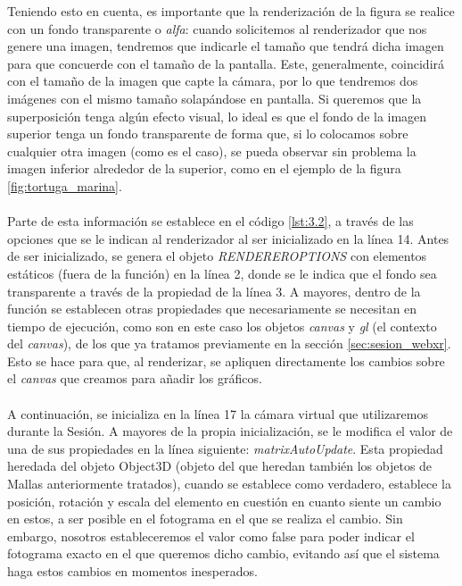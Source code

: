 \documentclass{subfiles}
\begin{document}
        Teniendo esto en cuenta, es importante que la renderización de la figura se realice con un fondo transparente o \textit{alfa}: cuando solicitemos al renderizador que nos genere una imagen, tendremos que indicarle el tamaño que tendrá dicha imagen para que concuerde con el tamaño de la pantalla. Este, generalmente, coincidirá con el tamaño de la imagen que capte la cámara, por lo que tendremos dos imágenes con el mismo tamaño solapándose en pantalla. Si queremos que la superposición tenga algún efecto visual, lo ideal es que el fondo de la imagen superior tenga un fondo transparente de forma que, si lo colocamos sobre cualquier otra imagen (como es el caso), se pueda observar sin problema la imagen inferior alrededor de la superior, como en el ejemplo de la figura \ref{fig:tortuga_marina}.
        
        \paragraph{}
        Parte de esta información se establece en el código \ref{lst:3.2}, a través de las opciones que se le indican al renderizador al ser inicializado en la línea 14. Antes de ser inicializado, se genera el objeto \textit{RENDEREROPTIONS} con elementos estáticos (fuera de la función) en la línea 2, donde se le indica que el fondo sea transparente a través de la propiedad de la línea 3. A mayores, dentro de la función se establecen otras propiedades que necesariamente se necesitan en tiempo de ejecución, como son en este caso los objetos \textit{canvas} y \textit{gl} (el contexto del \textit{canvas}), de los que ya tratamos previamente en la sección \ref{sec:sesion_webxr}. Esto se hace para que, al renderizar, se apliquen directamente los cambios sobre el \textit{canvas} que creamos para añadir los gráficos.

        \paragraph{}
        A continuación, se inicializa en la línea 17 la cámara virtual que utilizaremos durante la Sesión. A mayores de la propia inicialización, se le modifica el valor de una de sus propiedades en la línea siguiente: \textit{matrixAutoUpdate}. Esta propiedad heredada del objeto Object3D (objeto del que heredan también los objetos de Mallas anteriormente tratados), cuando se establece como verdadero, establece la posición, rotación y escala del elemento en cuestión en cuanto siente un cambio en estos, a ser posible en el fotograma en el que se realiza el cambio. Sin embargo, nosotros estableceremos el valor como false para poder indicar el fotograma exacto en el que queremos dicho cambio, evitando así que el sistema haga estos cambios en momentos inesperados.
        
\end{document}
